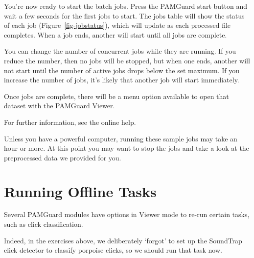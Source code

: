 \documentclass[
]{article}
\begin{document}
You're now ready to start the batch jobs. Press the PAMGuard start
button and wait a few seconds for the first jobs to start. The jobs
table will show the status of each job (Figure~\ref{fig-jobstatus}),
which will update as each processed file completes. When a job ends,
another will start until all jobs are complete.

You can change the number of concurrent jobs while they are running. If
you reduce the number, then no jobs will be stopped, but when one ends,
another will not start until the number of active jobs drops below the
set maximum. If you increase the number of jobs, it's likely that
another job will start immediately.

Once jobs are complete, there will be a menu option available to open
that dataset with the PAMGuard Viewer.

For further information, see the online help.

\begin{tcolorbox}[enhanced jigsaw, coltitle=black, breakable, rightrule=.15mm, colback=white, leftrule=.75mm, opacityback=0, left=2mm, toprule=.15mm, bottomrule=.15mm, arc=.35mm, title=\textcolor{quarto-callout-tip-color}{\faLightbulb}\hspace{0.5em}{Tip}, colbacktitle=quarto-callout-tip-color!10!white, titlerule=0mm, bottomtitle=1mm, colframe=quarto-callout-tip-color-frame, toptitle=1mm, opacitybacktitle=0.6]

Unless you have a powerful computer, running these sample jobs may take
an hour or more. At this point you may want to stop the jobs and take a
look at the preprocessed data we provided for you.

\end{tcolorbox}

\section{Running Offline Tasks}\label{running-offline-tasks}

Several PAMGuard modules have options in Viewer mode to re-run certain
tasks, such as click classification.

Indeed, in the exercises above, we deliberately `forgot' to set up the
SoundTrap click detector to classify porpoise clicks, so we should run
that task now.
\end{document}
